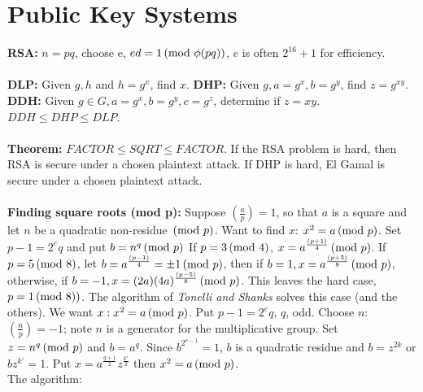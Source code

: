 \section{Public Key Systems}
{\bf RSA: } $n=pq$, choose e, $ed=1 \thinspace \textnormal{(mod } \phi(pq) \textnormal{)}$, $e$ is often $2^{16}+1$ for efficiency.
\\
\\
{\bf DLP: } Given $g, h$ and $h=g^x$, find $x$.  
{\bf DHP: }  Given $g, a=g^x, b=g^y$, find $z= g^{xy}$.
{\bf DDH: } Given $g \in G, a=g^x, b=g^y, c=g^z$, determine if $z=xy$.  $DDH \le DHP \le DLP$.
\\
\\
{\bf Theorem: } $FACTOR \le SQRT \le FACTOR$.  
If the RSA problem is hard, then RSA is secure under a chosen plaintext attack.  If DHP
is hard, El Gamal is secure under a chosen plaintext attack.
\\
\\
{\bf Finding square roots (mod p): } 
Suppose $({\frac a p})=1$, so that $a$ is a square and let $n$ be a quadratic
non-residue  $\thinspace \textnormal{(mod } p \textnormal{)}$.  Want to find $x$:
$x^2= a \thinspace \textnormal{(mod } p \textnormal{)}$.  Set $p-1= 2^{e}q$ and put $b=n^q \thinspace \textnormal{(mod } p \textnormal{)}$
If $p= 3 \thinspace \textnormal{(mod } 4 \textnormal{)}$, $x= a^{\frac {(p+1)} {4 }} \thinspace \textnormal{(mod } p \textnormal{)}$.
If $p= 5 \thinspace \textnormal{(mod } 8 \textnormal{)}$, let
$b=a^{\frac {(p-1)}{4}} = \pm 1\thinspace \textnormal{(mod } p \textnormal{)}$, then
if $b=1, x= a^{\frac {(p+3)} {8}} \thinspace \textnormal{(mod } p \textnormal{)}$, otherwise,
if $b= -1, x= (2a)(4a)^{\frac {(p-5)} {8}} \thinspace \textnormal{(mod } p \textnormal{)}$.
This leaves the hard case, $p=1 \thinspace \textnormal{(mod } 8) \textnormal{)}$.  The algorithm of \emph {Tonelli
and Shanks} solves this case (and the others).
We want $x: x^2= a \thinspace \textnormal{(mod } p \textnormal{)}$.  Put
$p-1=2^e  q$, $q$, odd.
Choose $n$: $({\frac n p})= -1$; note $n$ is a generator
for the multiplicative group. Set $z= n^q \thinspace \textnormal{(mod } p \textnormal{)}$ and $b= a^q$.  Since $b^{2^{e-1}}= 1$,
$b$ is a quadratic residue and $b= z^{2k}$ or $bz^{k'}=1$.  Put $x= a^{\frac {q+1} 2} z^{{\frac {k'} 2}}$
then $x^2 = a \thinspace \textnormal{(mod } p \textnormal{)}$.
\\
The algorithm:\\

